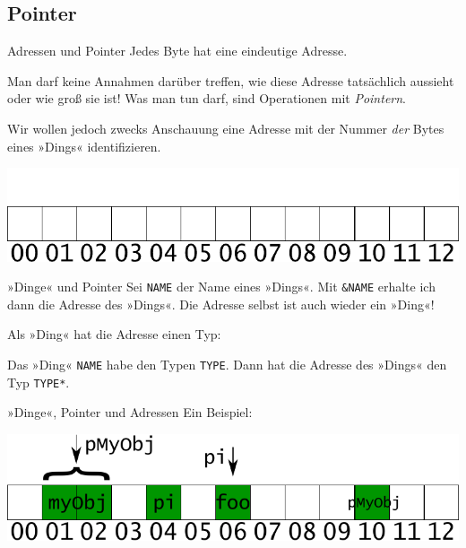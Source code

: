 \subsection{Pointer}

\begin{frame}[fragile]{Adressen und Pointer}
	Jedes Byte hat eine eindeutige Adresse.
	
	Man darf keine Annahmen darüber treffen, wie diese Adresse tatsächlich aussieht oder wie groß sie ist!
	Was man tun darf, sind Operationen mit \emph{Pointern}.
	
	\pause
	
	Wir wollen jedoch zwecks Anschauung eine Adresse mit der Nummer \emph{der} Bytes eines »Dings« identifizieren.
	
	\includegraphics[width=\linewidth]{images/free}
\end{frame}

\begin{frame}[fragile]{»Dinge« und Pointer}
	Sei \verb|NAME| der Name eines »Dings«. Mit \verb|&NAME| erhalte ich dann die Adresse des »Dings«. Die Adresse selbst ist auch wieder ein »Ding«!
	
	\vspace{1em}
	\pause
	
	Als »Ding« hat die Adresse einen Typ:
	{\footnotesize
	\begin{block}{}
		
	\end{block}
	}
	
	\pause
	
	Das »Ding« \verb|NAME| habe den Typen \verb|TYPE|. Dann hat die Adresse des »Dings« den Typ \verb|TYPE*|.
\end{frame}

\begin{frame}[fragile]{»Dinge«, Pointer und Adressen}
	Ein Beispiel:
	
	{\footnotesize
	\begin{block}{}
		
	\end{block}
	}
	
	\pause
	\vspace{1em}
	
	\includegraphics[width=\linewidth]{images/object_points_addr}
\end{frame}

